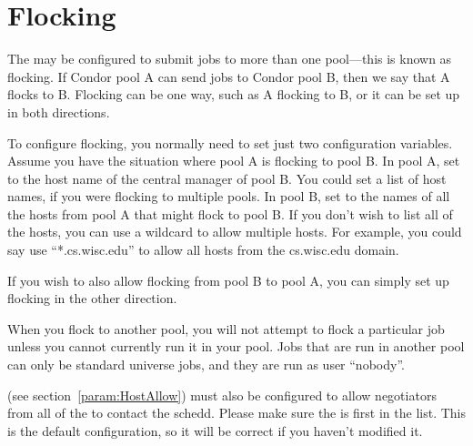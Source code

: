 \section{\label{sec:Flocking}Flocking}

The  may be configured to submit jobs to more than one
pool---this is known as flocking. If Condor pool A can send jobs to
Condor pool B, then we say that A flocks to B. Flocking can be one
way, such as A flocking to B, or it can be set up in both directions. 

To configure flocking, you normally need to set just two configuration
variables. Assume you have the situation where pool A is flocking to
pool B. In pool A, set  to the host name of the
central manager of pool B. You could set a list of host names, if you
were flocking to multiple pools. In pool B, set 
to the names of all the hosts from pool A that might flock to pool
B. If you don't wish to list all of the hosts, you can use a wildcard
to allow multiple hosts. For example, you could say use
``*.cs.wisc.edu'' to allow all hosts from the cs.wisc.edu domain. 

If you wish to also allow flocking from pool B to pool A, you can
simply set up flocking in the other direction.

When you flock to another pool, you will not attempt to flock a
particular job unless you cannot currently run it in your pool. Jobs
that are run in another pool can only be standard universe jobs, and
they are run as user ``nobody''.

 (see
section~\ref{param:HostAllow}) must also be configured to allow
negotiators from all of the  to
contact the schedd.  Please make sure the 
is first in the  list.  This
is the default configuration, so it will be correct if you haven't
modified it.


